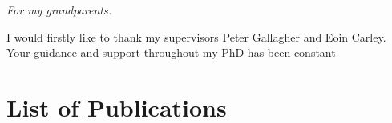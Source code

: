 
\begin{dedication}
\textit{For my grandparents.}
\end{dedication}

\begin{acknowledgements}
I would firstly like to thank my supervisors Peter Gallagher and Eoin Carley. Your guidance and support throughout my PhD has been constant 
\end{acknowledgements}

\chapter{List of Publications}
\label{chapter:publications}
%
